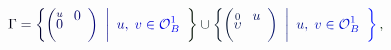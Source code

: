 \documentclass[12pt]{article}
\begin{document}
\makeatletter
\renewcommand*{\@textcolor}[3]{%
  \protect\leavevmode
  \begingroup
    \color#1{#2}#3%
  \endgroup
}
\makeatother
\begin{displaymath}
\mathcolor[RGB]{0,0,15}{\Gamma} \mathcolor[RGB]{0,0,30}{=} \mathcolor[RGB]{0,0,45}{\left\{} \mathcolor[RGB]{0,0,60}{\left(} \stackrel { \mathcolor[RGB]{0,0,75}{u} } { \mathcolor[RGB]{0,0,90}{0} } \begin{array} {c} { { { \mathcolor[RGB]{0,0,105}{0} } } } \\ { { { { } } } } \end{array} \mathcolor[RGB]{0,0,120}{\right)} \textrm { } \mathcolor[RGB]{0,0,135}{\bigg|} \begin{array} {c} { { { \mathcolor[RGB]{0,0,150}{u} \mathcolor[RGB]{0,0,165}{,} \mathcolor[RGB]{0,0,180}{\;} \mathcolor[RGB]{0,0,195}{v} \mathcolor[RGB]{0,0,210}{\in} { \mathcal { \mathcolor[RGB]{0,0,225}{O} } } _ { \mathcolor[RGB]{0,0,240}{B} } ^ { \mathcolor[RGB]{0,0,255}{1} } } } } \end{array} \mathcolor[RGB]{0,15,0}{\right\}} \mathcolor[RGB]{0,15,15}{\cup} \mathcolor[RGB]{0,15,30}{\left\{} \mathcolor[RGB]{0,15,45}{\left(} \stackrel { \mathcolor[RGB]{0,15,60}{0} } { \mathcolor[RGB]{0,15,75}{\upsilon} } \begin{array} {c} { { { \mathcolor[RGB]{0,15,90}{u} } } } \\ { { { { } } } } \end{array} \mathcolor[RGB]{0,15,105}{\right)} \textrm { } \mathcolor[RGB]{0,15,120}{\bigg|} \begin{array} {c} { { { \mathcolor[RGB]{0,15,135}{u} \mathcolor[RGB]{0,15,150}{,} \mathcolor[RGB]{0,15,165}{\;} \mathcolor[RGB]{0,15,180}{v} \mathcolor[RGB]{0,15,195}{\in} { \mathcal { \mathcolor[RGB]{0,15,210}{O} } } _ { \mathcolor[RGB]{0,15,225}{B} } ^ { \mathcolor[RGB]{0,15,240}{1} } } } } \end{array} \mathcolor[RGB]{0,15,255}{\right\}} \mathcolor[RGB]{0,30,0}{,}
\end{displaymath}
\end{document}
